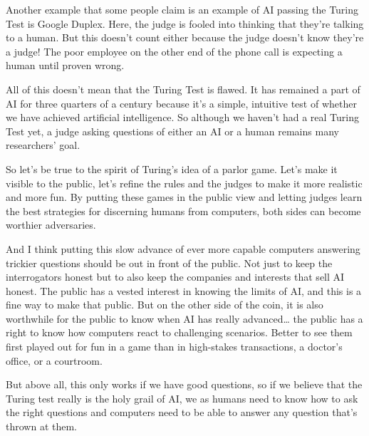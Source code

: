 Another example that some people claim is an example of AI passing the Turing Test is Google Duplex.  Here, the judge is fooled into thinking that they’re talking to a human.  But this doesn’t count either because the judge doesn’t know they’re a judge!  The poor employee on the other end of the phone call is expecting a human until proven wrong.

All of this doesn’t mean that the Turing Test is flawed.  It has remained a part of AI for three quarters of a century because it’s a simple, intuitive test of whether we have achieved artificial intelligence.  So although we haven’t had a real Turing Test yet, a judge asking questions of either an AI or a human remains many researchers’ goal.

So let’s be true to the spirit of Turing’s idea of a parlor game.  Let’s make it visible to the public, let’s refine the rules and the judges to make it more realistic and more fun.  By putting these games in the public view and letting judges learn the best strategies for discerning humans from computers, both sides can become worthier adversaries.  

And I think putting this slow advance of ever more capable computers answering trickier questions should be out in front of the public.  Not just to keep the interrogators honest but to also keep the companies and interests that sell AI honest.  The public has a vested interest in knowing the limits of AI, and this is a fine way to make that public.  But on the other side of the coin, it is also worthwhile for the public to know when AI has really advanced… the public has a right to know how computers react to challenging scenarios.  Better to see them first played out for fun in a game than in high-stakes transactions, a doctor’s office, or a courtroom.

But above all, this only works if we have good questions, so if we believe that the Turing test really is the holy grail of AI, we as humans need to know how to ask the right questions and computers need to be able to answer any question that’s thrown at them.
